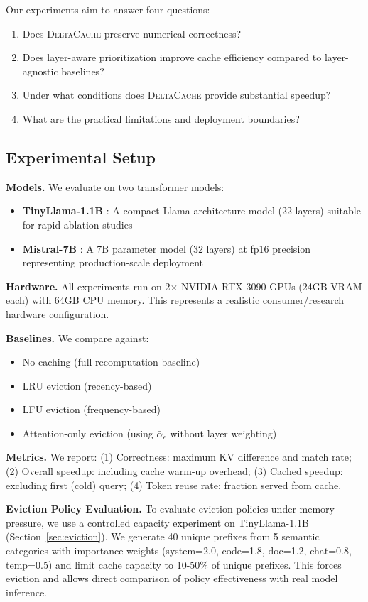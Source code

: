 \documentclass[10pt,conference]{IEEEtran}
\newcommand{\deltacache}{\textsc{DeltaCache}}
\begin{document}
Our experiments aim to answer four questions:
\begin{enumerate}
\item Does \deltacache{} preserve numerical correctness?
\item Does layer-aware prioritization improve cache efficiency compared to layer-agnostic baselines?
\item Under what conditions does \deltacache{} provide substantial speedup?
\item What are the practical limitations and deployment boundaries?
\end{enumerate}

\subsection{Experimental Setup}

\textbf{Models.} We evaluate on two transformer models:
\begin{itemize}
\item \textbf{TinyLlama-1.1B} \cite{tinyllama}: A compact Llama-architecture model (22 layers) suitable for rapid ablation studies
\item \textbf{Mistral-7B} \cite{jiang2023mistral}: A 7B parameter model (32 layers) at fp16 precision representing production-scale deployment
\end{itemize}

\textbf{Hardware.} All experiments run on 2$\times$ NVIDIA RTX 3090 GPUs (24GB VRAM each) with 64GB CPU memory. This represents a realistic consumer/research hardware configuration.

\textbf{Baselines.} We compare against:
\begin{itemize}
\item No caching (full recomputation baseline)
\item LRU eviction (recency-based)
\item LFU eviction (frequency-based)
\item Attention-only eviction (using $\bar{\alpha}_e$ without layer weighting)
\end{itemize}

\textbf{Metrics.} We report: (1) Correctness: maximum KV difference and match rate; (2) Overall speedup: including cache warm-up overhead; (3) Cached speedup: excluding first (cold) query; (4) Token reuse rate: fraction served from cache.

\textbf{Eviction Policy Evaluation.} To evaluate eviction policies under memory pressure, we use a controlled capacity experiment on TinyLlama-1.1B (Section~\ref{sec:eviction}). We generate 40 unique prefixes from 5 semantic categories with importance weights (system=2.0, code=1.8, doc=1.2, chat=0.8, temp=0.5) and limit cache capacity to 10-50\% of unique prefixes. This forces eviction and allows direct comparison of policy effectiveness with real model inference.
\end{document}

